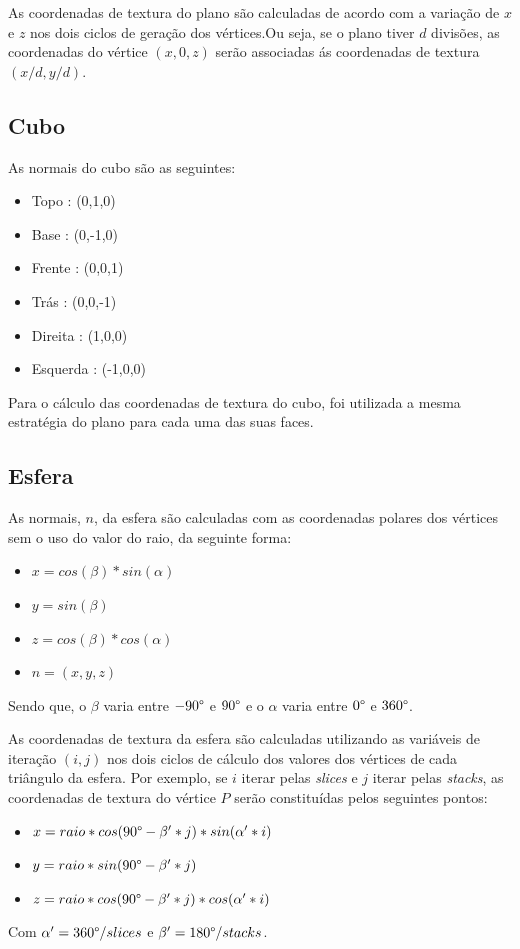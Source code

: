 \documentclass[11pt,a4paper]{report}
\begin{document}
As coordenadas de textura do plano são calculadas de acordo com a variação de $x$ e $z$ nos dois ciclos de geração dos vértices.Ou seja, se o plano tiver $d$ divisões, as coordenadas do vértice $(x,0,z)$ serão associadas ás coordenadas de textura $(x/d ,y/d)$.

\subsection{Cubo}
As normais do cubo são as seguintes:
\begin{itemize}
    \item Topo : (0,1,0)
    \item Base : (0,-1,0)
    \item Frente : (0,0,1)
    \item Trás : (0,0,-1)
    \item Direita : (1,0,0)
    \item Esquerda : (-1,0,0)
\end{itemize}

Para o cálculo das coordenadas de textura do cubo, foi utilizada a mesma estratégia do plano para cada uma das suas faces.

\subsection{Esfera}
As normais, $n$, da esfera são calculadas com as coordenadas polares dos vértices sem o uso do valor do raio, da seguinte forma:
\begin{itemize}
    \item $x = cos(\beta)*sin(\alpha)$
    \item $y = sin(\beta)$
    \item $z = cos(\beta)*cos(\alpha)$
    \item $n = (x, y, z)$ 
\end{itemize}

Sendo que, o $\beta$ varia entre $-90 \text{\textdegree} $ e $90 \text{\textdegree}$ e o $\alpha$ varia entre $0 \text{\textdegree}$ e $360 \text{\textdegree}$.

As coordenadas de textura da esfera são calculadas utilizando as variáveis de iteração $(i, j)$ nos dois ciclos de cálculo dos valores dos vértices de cada triângulo da esfera. Por exemplo, se $i$ iterar pelas \textit{slices} e $j$ iterar pelas \textit{stacks}, as coordenadas de textura do vértice $P$ serão constituídas pelos seguintes pontos:
\begin{itemize}
    \item $x = raio*cos(90 \text{\textdegree} - \beta'*j)*sin(\alpha'*i)$
    \item $y = raio*sin(90 \text{\textdegree} - \beta'*j)$
    \item $z = raio*cos(90 \text{\textdegree} - \beta'*j)*cos(\alpha'*i)$
\end{itemize}
Com $\alpha' =  360 \text{\textdegree}/slices$ e $\beta' =  180 \text{\textdegree}/stacks$.
\end{document}
